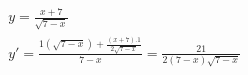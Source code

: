 \begin{ex}
\begin{align}
&y=\frac{x+7}{\sqrt{7-x}}\nonumber\\
&y'=\frac{1(\sqrt{7-x})+\frac{(x+7).1}{2\sqrt{7-x}}}{7-x}=\frac{21}{2(7-x)\sqrt{7-x}}\nonumber
\end{align}
\end{ex}